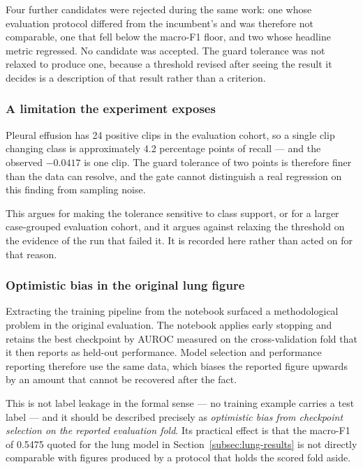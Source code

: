 Four further candidates were rejected during the same work: one whose evaluation protocol
differed from the incumbent's and was therefore not comparable, one that fell below the
macro-F1 floor, and two whose headline metric regressed. No candidate was accepted. The
guard tolerance was not relaxed to produce one, because a threshold revised after seeing the
result it decides is a description of that result rather than a criterion.

\subsubsection{A limitation the experiment exposes}

Pleural effusion has 24 positive clips in the evaluation cohort, so a single clip changing
class is approximately 4.2 percentage points of recall --- and the observed $-0.0417$ is one
clip. The guard tolerance of two points is therefore finer than the data can resolve, and the
gate cannot distinguish a real regression on this finding from sampling noise.

This argues for making the tolerance sensitive to class support, or for a larger case-grouped
evaluation cohort, and it argues against relaxing the threshold on the evidence of the run
that failed it. It is recorded here rather than acted on for that reason.

\subsubsection{Optimistic bias in the original lung figure}

Extracting the training pipeline from the notebook surfaced a methodological problem in the
original evaluation. The notebook applies early stopping and retains the best checkpoint by
AUROC measured on the cross-validation fold that it then reports as held-out performance.
Model selection and performance reporting therefore use the same data, which biases the
reported figure upwards by an amount that cannot be recovered after the fact.

This is not label leakage in the formal sense --- no training example carries a test label ---
and it should be described precisely as \emph{optimistic bias from checkpoint selection on the
reported evaluation fold}. Its practical effect is that the macro-F1 of 0.5475 quoted for the
lung model in Section~\ref{subsec:lung-results} is not directly comparable with figures
produced by a protocol that holds the scored fold aside.


